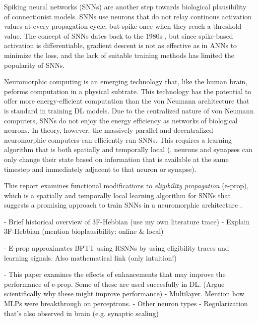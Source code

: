 Spiking neural networks (SNNs) are another step towards biological plausibility of connectionist models.
SNNs use neurons that do not relay continous activation values at every propagation cycle, but spike once when they reach a threshold value.
The concept of SNNs dates back to the 1980s \citep{hopfield1982neural}, but since spike-based activation is differentiable, gradient descent is not as effective as in ANNs to minimize the loss, and the lack of suitable training methods has limited the popularity of SNNs.

Neuromorphic computing is an emerging technology that, like the human brain, peforms computation in a physical subtrate.
This technology has the potential to offer more energy-efficient computation than the von Neumann architecture that is standard in training DL models.
Due to the centralized nature of von Neumann computers, SNNs do not enjoy the energy efficiency as networks of biological neurons.
In theory, however, the massively parallel and decentralized neuromorphic computers can efficiently run SNNs.
This requires a learning algorithm that is both spatially and temporally local (\ie, neurons and synapses can only change their state based on information that is available at the same timestep and immediately adjacent to that neuron or synapse).

This report examines functional modifications to \emph{eligibility propagation} (e-prop), which is a spatially and temporally local learning algorithm for SNNs that suggests a promising approach to train SNNs in a neuromorphic architecture \citep{bellec2020solution}.

\begin{tcolorbox}[colback=orange]
- Brief historical overview of 3F-Hebbian (use my own literature trace)
    - Explain 3F-Hebbian (mention bioplausibility: online \& local)


\vspace{10cm}

\end{tcolorbox}

\begin{tcolorbox}[colback=orange]

- E-prop approximates BPTT using RSNNs by using eligibility traces and learning signals. Also mathematical link (only intuition!)

\vspace{8cm}

\end{tcolorbox}

\begin{tcolorbox}[colback=orange]

- This paper examines the effects of enhancements that may improve the performance of e-prop. Some of these are used succesfully in DL. (Argue scientifically why these might improve performance)
    - Multilayer. Mention how MLPs were breakthrough on perceptrons.
    - Other neuron types
    - Regularization that's also observed in brain (e.g. synaptic scaling)

\vspace{8cm}

\end{tcolorbox}
